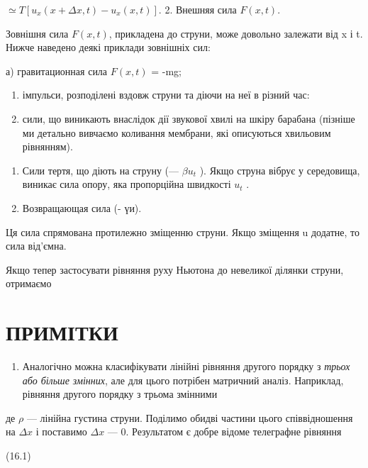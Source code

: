 \documentclass[
  ukrainian,
]{article}
\providecommand{\tightlist}{%
  \setlength{\itemsep}{0pt}\setlength{\parskip}{0pt}}
\begin{document}
\(\simeq T [u_x(x + \Delta x, t) - u_x(x, t)].\) 2. Внешняя сила
\(F (x, t)\).

Зовнішня сила \(F(x, t)\), прикладена до струни, може довольно залежати
від x і t. Нижче наведено деякі приклади зовнішніх сил:

а) гравитационная сила \(F(x, t)\) = -mg;

\begin{enumerate}
\def\labelenumi{\alph{enumi})}
\setcounter{enumi}{1}
\item
  імпульси, розподілені вздовж струни та діючи на неї в різний час:
\item
  сили, що виникають внаслідок дії звукової хвилі на шкіру барабана
  (пізніше ми детально вивчаємо коливання мембрани, які описуються
  хвильовим рівнянням).
\end{enumerate}

\begin{enumerate}
\def\labelenumi{\arabic{enumi}.}
\setcounter{enumi}{2}
\item
  Сили тертя, що діють на струну (--- \(\beta u_t\) ). Якщо струна
  вібрує у середовища, виникає сила опору, яка пропорційна швидкості
  \(u_t\) .
\item
  Возвращающая сила (- үи).
\end{enumerate}

Ця сила спрямована протилежно зміщенню струни. Якщо зміщення u додатне,
то сила від'ємна.

Якщо тепер застосувати рівняння руху Ньютона до невеликої ділянки
струни, отримаємо

\section{ПРИМІТКИ}\label{ux43fux440ux438ux43cux456ux442ux43aux438-1}

\begin{enumerate}
\def\labelenumi{\arabic{enumi}.}
\tightlist
\item
  Аналогічно можна класифікувати лінійні рівняння другого порядку з
  \emph{трьох або більше змінних}, але для цього потрібен матричний
  аналіз. Наприклад, рівняння другого порядку з трьома змінними
\end{enumerate}

де \(\rho\) --- лінійна густина струни. Поділимо обидві частини цього
співвідношення на \(\Delta x\) і поставимо \(\Delta x\) --- 0.
Результатом є добре відоме телеграфне рівняння

(16.1)
\end{document}
